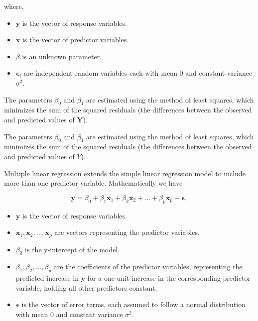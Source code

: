 \documentclass[12pt, twoside,hidelinks]{article}
\theoremstyle{definition}
\numberwithin{equation}{section}
\begin{document}
where,

\begin{itemize}
    \item \(\mathbf{y}\) is the vector of response variables.
    \item \(\mathbf{x}\) is the vector of predictor variables.
    \item \(\beta\) is an unknown parameter.
    \item \(\boldsymbol{\epsilon}_i\) are independent random variables each with mean 0 and constant variance \(\sigma^2\).
\end{itemize}

The parameters \(\beta_0\) and \(\beta_1\) are estimated using the method of least squares, which minimizes the sum of the squared residuals (the differences between the observed and predicted values of \(\mathbf{Y}\)).

The parameters \(\beta_0\) and \(\beta_1\) are estimated using the method of least squares, which minimizes the sum of the squared residuals (the differences between the observed and predicted values of \(Y\)).
\newline

Multiple linear regression extends the simple linear regression model to include more than one predictor variable. Mathematically we have

\begin{equation}
    \mathbf{y} = \beta_0 + \beta_1 \mathbf{x}_1 + \beta_2 \mathbf{x}_2 + \ldots + \beta_p \mathbf{x}_p + \boldsymbol{\epsilon},
    \label{eq:mlm_general_form}
\end{equation}

\begin{itemize}
    \item $\mathbf{y}$ is the vector of response variables.
    \item $\mathbf{x}_1, \mathbf{x}_2, \ldots, \mathbf{x}_p$ are vectors representing the predictor variables.
    \item $\beta_0$ is the y-intercept of the model.
    \item $\beta_1, \beta_2, \ldots, \beta_p$ are the coefficients of the predictor variables, representing the predicted increase in $\mathbf{y}$ for a one-unit increase in the corresponding predictor variable, holding all other predictors constant.
    \item $\boldsymbol{\epsilon}$ is the vector of error terms, each assumed to follow a normal distribution with mean 0 and constant variance $\sigma^2$.
\end{itemize}
\end{document}
